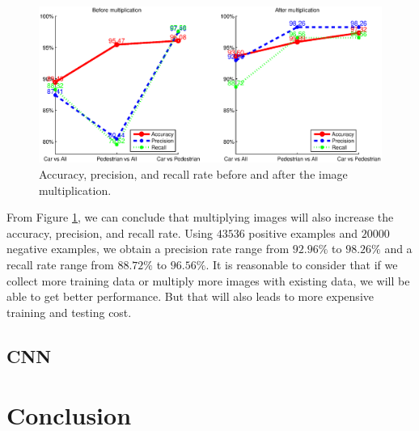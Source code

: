 \documentclass{article} %
\begin{document}
\begin{figure}[htb]
\begin{center}
\includegraphics[width=\textwidth]{test_apr.eps}
\end{center}
\caption{Accuracy, precision, and recall rate before and after the image multiplication.
\label{fig:test_apr}}
\end{figure}

From Figure \ref{fig:test_apr}, we can conclude that multiplying images will also increase the accuracy, precision, and recall rate. Using $43536$ positive examples and $20000$ negative examples, we obtain a precision rate range from $92.96\%$ to $98.26\%$ and a recall rate range from $88.72\%$ to $96.56\%$. It is reasonable to consider that if we collect more training data or multiply more images with existing data, we will be able to get better performance. But that will also leads to more expensive training and testing cost. 

\subsection{CNN}

\section{Conclusion}

\end{document}
